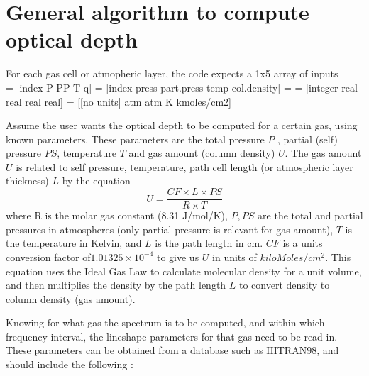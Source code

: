 \documentclass[11pt]{article}
\begin{document}
\newpage
\section{General algorithm to compute optical depth}
For each gas cell or atmopheric layer, the code expects a 1x5 array of inputs \\
[ i  p pp T q] = [index  P PP T q] = 
[index press part.press temp col.density] = 
= [integer real real real real] = [[no units] atm atm K kmoles/cm2]

Assume the user wants the optical depth to be computed for a certain gas, 
using known parameters. These parameters are the total pressure $P$ , 
partial (self) pressure $PS$, temperature $T$ and gas amount (column
density) $U$. The gas amount $U$ is related to self pressure, temperature,
path cell length (or atmospheric layer thickness) $L$ by the equation 
\[ 
U = \frac{CF \times L \times PS}{R \times T}
\]
where R is the molar gas constant (8.31 J/mol/K), $P,PS$ are the total and
partial pressures in atmospheres (only partial pressure is relevant for gas
amount), $T$ is the temperature in Kelvin, and $L$ is the path length in cm.  
$CF$ is a units conversion factor of$1.01325 \times 10^{-4}$ to give us $U$ in
units of $kiloMoles/cm^{2}$. This equation uses the Ideal Gas Law to calculate
molecular density for a unit volume, and then multiplies the density by the 
path length $L$ to convert density to column density (gas amount).
 
Knowing for what gas the spectrum is to be computed, and within which 
frequency interval, the lineshape parameters for that gas need to be read 
in. These  parameters can be obtained from a database such as HITRAN98, 
and should include the following : 
\end{document}
